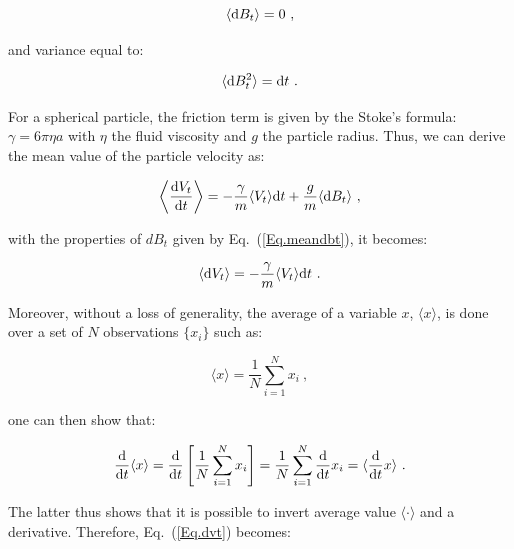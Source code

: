 \begin{equation}
	\langle \textnormal{d}B_t \rangle  = 0~,
	\label{Eq.meandbt}
\end{equation}

and variance equal to: 

\begin{equation}
	\langle \textnormal{d}B_t ^2 \rangle = \textnormal{d}t~.
	\label{Eq.meandbt2}
\end{equation}

For a spherical particle, the friction term is given by the Stoke's formula: $\gamma = 6\pi \eta a$ with $\eta$ the fluid viscosity and $g$ the particle radius. Thus, we can derive the mean value of the particle velocity as:


\begin{equation}
	\left\langle  \frac{ \textnormal{d}V_t}{\textnormal{d}t} \right\rangle = - \frac{\gamma}{m} \langle V_t \rangle \textnormal{d}t  + \frac{g}{m} \langle  \textnormal{d}B_t \rangle ~,
	\label{Eq.langevinsd}
\end{equation}

with the properties of $dB_t$ given by Eq.~(\ref{Eq.meandbt}), it becomes:

\begin{equation}
	\langle  \textnormal{d}V_t \rangle = - \frac{\gamma}{m} \langle V_t \rangle \textnormal{d}t ~.
	\label{Eq.dvt}
\end{equation}

Moreover, without a loss of generality, the average of a variable $x$, $\langle x \rangle$, is done over a set of $N$ observations $\{x_i\}$ such as:

\begin{equation}
	\langle x \rangle = \frac{1}{N} \sum _{i=1}^N x_i ~,
\end{equation}

one can then show that:

\begin{equation}
	\frac{\textnormal{d}}{\textnormal{d}t}\langle x \rangle = \frac{\textnormal{d}}{ \textnormal{d}t} \left[\frac{1}{N} \sum _{i=1}^N x_i \right] = 
	\frac{1}{N} \sum _{i=1}^N \frac{\textnormal{d}}{ \textnormal{d}t} x_i = \langle\frac{\textnormal{d}}{\textnormal{d}t} x \rangle ~.
\end{equation}

The latter thus shows that it is possible to invert average value $\langle \cdot \rangle$ and a derivative. Therefore, Eq.~(\ref{Eq.dvt}) becomes:

